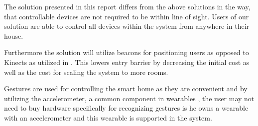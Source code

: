 The solution presented in this report differs from the above solutions in the way, that controllable devices are not required to be within line of sight. Users of our solution are able to control all devices within the system from anywhere in their house.

Furthermore the solution will utilize beacons for positioning users as opposed to Kinects as utilized in \cite{caon2011context}. This lowers entry barrier by decreasing the initial cost as well as the cost for scaling the system to more rooms.

Gestures are used for controlling the smart home as they are convenient and by utilizing the accelerometer, a common component in wearables \cite[pp. 3-4]{prespecialisation}, the user may not need to buy hardware specifically for recognizing gestures is he owns a wearable with an accelerometer and this wearable is supported in the system.


